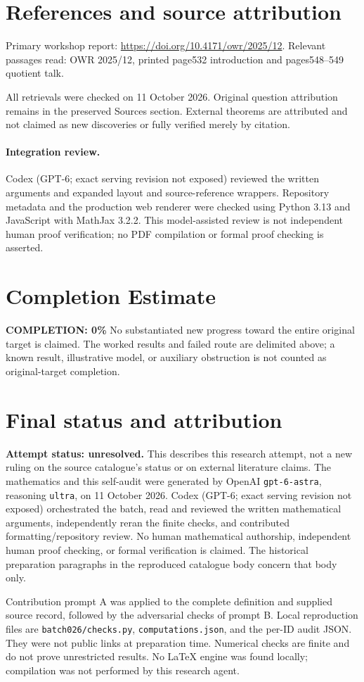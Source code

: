 \documentclass[11pt]{article}
\begin{document}
\section{References and source attribution}
Primary workshop report: \url{https://doi.org/10.4171/owr/2025/12}. Relevant passages read: OWR 2025/12, printed page532 introduction and pages548--549 quotient talk.

All retrievals were checked on 11 October 2026. Original question attribution remains in the preserved Sources section. External theorems are attributed and not claimed as new discoveries or fully verified merely by citation.


\paragraph{Integration review.} Codex (GPT-6; exact serving revision not exposed) reviewed the written arguments and expanded layout and source-reference wrappers. Repository metadata and the production web renderer were checked using Python 3.13 and JavaScript with MathJax 3.2.2. This model-assisted review is not independent human proof verification; no PDF compilation or formal proof checking is asserted.

\section{Completion Estimate}
\noindent\textbf{COMPLETION: 0\%}
No substantiated new progress toward the entire original target is claimed. The worked results and failed route are delimited above; a known result, illustrative model, or auxiliary obstruction is not counted as original-target completion.

\section{Final status and attribution}
\textbf{Attempt status: unresolved.} This describes this research attempt, not a new ruling on the source catalogue's status or on external literature claims.
The mathematics and this self-audit were generated by OpenAI \texttt{gpt-6-astra}, reasoning \texttt{ultra}, on 11 October 2026. Codex (GPT-6; exact serving revision not exposed) orchestrated the batch, read and reviewed the written mathematical arguments, independently reran the finite checks, and contributed formatting/repository review. No human mathematical authorship, independent human proof checking, or formal verification is claimed. The historical preparation paragraphs in the reproduced catalogue body concern that body only.

Contribution prompt A was applied to the complete definition and supplied source record, followed by the adversarial checks of prompt B. Local reproduction files are \texttt{batch026/checks.py}, \texttt{computations.json}, and the per-ID audit JSON. They were not public links at preparation time. Numerical checks are finite and do not prove unrestricted results. No LaTeX engine was found locally; compilation was not performed by this research agent.
\end{document}
